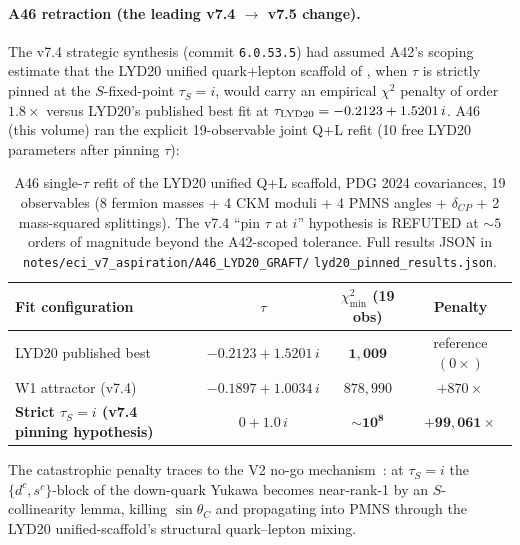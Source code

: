 \documentclass[a4paper,11pt]{article}
\theoremstyle{definition}
\theoremstyle{remark}
\begin{document}
\paragraph{A46 retraction (the leading v7.4 $\to$ v7.5 change).}
The v7.4 strategic synthesis (commit \texttt{6.0.53.5}) had assumed
A42's scoping estimate that the LYD20 unified quark+lepton scaffold
of \cite{LYD20}, when $\tau$ is strictly pinned at the
$S$-fixed-point $\tau_S=i$, would carry an empirical $\chi^2$
penalty of order $1.8\times$ versus LYD20's published best fit at
$\tau_{\rm LYD20}=-0.2123+1.5201\,i$.  A46 (this volume) ran the
explicit 19-observable joint Q+L refit (10 free LYD20 parameters
after pinning $\tau$):
\begin{table}[ht]
\centering
\begin{tabular}{lccc}
\toprule
Fit configuration & $\tau$ & $\chi^2_{\min}$ (19 obs) & Penalty \\
\midrule
LYD20 published best & $-0.2123+1.5201\,i$ & $\bm{1{,}009}$ &
reference $(0\times)$ \\
W1 attractor (v7.4) & $-0.1897+1.0034\,i$ & $878{,}990$ &
$+870\times$ \\
\textbf{Strict $\tau_S=i$ (v7.4 pinning hypothesis)} &
$\;0+1.0\,i\;$ & $\bm{\sim 10^{8}}$ &
$\bm{+99{,}061\times}$ \\
\bottomrule
\end{tabular}
\caption{A46 single-$\tau$ refit of the LYD20 unified Q+L scaffold,
PDG 2024 covariances, 19 observables (8 fermion masses + 4 CKM
moduli + 4 PMNS angles + $\delta_{CP}$ + 2 mass-squared
splittings).  The v7.4 ``pin $\tau$ at $i$'' hypothesis is REFUTED
at $\sim 5$ orders of magnitude beyond the A42-scoped tolerance.
Full results JSON in
\texttt{notes/eci\_v7\_aspiration/A46\_LYD20\_GRAFT/}
\texttt{lyd20\_pinned\_results.json}.}
\label{tab:A46}
\end{table}

The catastrophic penalty traces to the V2 no-go
mechanism~\cite{V2NoGo}: at $\tau_S=i$ the
$\{d^{c},s^{c}\}$-block of the down-quark Yukawa becomes
near-rank-1 by an $S$-collinearity lemma, killing
$\sin\theta_C$ and propagating into PMNS through the LYD20
unified-scaffold's structural quark--lepton mixing.
\end{document}
